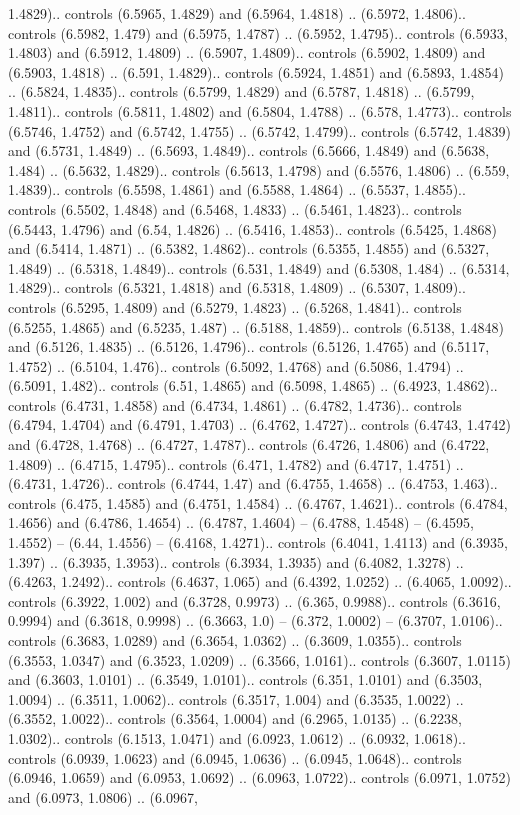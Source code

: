 1.4829).. controls (6.5965, 1.4829) and (6.5964, 1.4818) .. (6.5972, 1.4806).. controls (6.5982, 1.479) and (6.5975, 1.4787) .. (6.5952, 1.4795).. controls (6.5933, 1.4803) and (6.5912, 1.4809) .. (6.5907, 1.4809).. controls (6.5902, 1.4809) and (6.5903, 1.4818) .. (6.591, 1.4829).. controls (6.5924, 1.4851) and (6.5893, 1.4854) .. (6.5824, 1.4835).. controls (6.5799, 1.4829) and (6.5787, 1.4818) .. (6.5799, 1.4811).. controls (6.5811, 1.4802) and (6.5804, 1.4788) .. (6.578, 1.4773).. controls (6.5746, 1.4752) and (6.5742, 1.4755) .. (6.5742, 1.4799).. controls (6.5742, 1.4839) and (6.5731, 1.4849) .. (6.5693, 1.4849).. controls (6.5666, 1.4849) and (6.5638, 1.484) .. (6.5632, 1.4829).. controls (6.5613, 1.4798) and (6.5576, 1.4806) .. (6.559, 1.4839).. controls (6.5598, 1.4861) and (6.5588, 1.4864) .. (6.5537, 1.4855).. controls (6.5502, 1.4848) and (6.5468, 1.4833) .. (6.5461, 1.4823).. controls (6.5443, 1.4796) and (6.54, 1.4826) .. (6.5416, 1.4853).. controls (6.5425, 1.4868) and (6.5414, 1.4871) .. (6.5382, 1.4862).. controls (6.5355, 1.4855) and (6.5327, 1.4849) .. (6.5318, 1.4849).. controls (6.531, 1.4849) and (6.5308, 1.484) .. (6.5314, 1.4829).. controls (6.5321, 1.4818) and (6.5318, 1.4809) .. (6.5307, 1.4809).. controls (6.5295, 1.4809) and (6.5279, 1.4823) .. (6.5268, 1.4841).. controls (6.5255, 1.4865) and (6.5235, 1.487) .. (6.5188, 1.4859).. controls (6.5138, 1.4848) and (6.5126, 1.4835) .. (6.5126, 1.4796).. controls (6.5126, 1.4765) and (6.5117, 1.4752) .. (6.5104, 1.476).. controls (6.5092, 1.4768) and (6.5086, 1.4794) .. (6.5091, 1.482).. controls (6.51, 1.4865) and (6.5098, 1.4865) .. (6.4923, 1.4862).. controls (6.4731, 1.4858) and (6.4734, 1.4861) .. (6.4782, 1.4736).. controls (6.4794, 1.4704) and (6.4791, 1.4703) .. (6.4762, 1.4727).. controls (6.4743, 1.4742) and (6.4728, 1.4768) .. (6.4727, 1.4787).. controls (6.4726, 1.4806) and (6.4722, 1.4809) .. (6.4715, 1.4795).. controls (6.471, 1.4782) and (6.4717, 1.4751) .. (6.4731, 1.4726).. controls (6.4744, 1.47) and (6.4755, 1.4658) .. (6.4753, 1.463).. controls (6.475, 1.4585) and (6.4751, 1.4584) .. (6.4767, 1.4621).. controls (6.4784, 1.4656) and (6.4786, 1.4654) .. (6.4787, 1.4604) -- (6.4788, 1.4548) -- (6.4595, 1.4552) -- (6.44, 1.4556) -- (6.4168, 1.4271).. controls (6.4041, 1.4113) and (6.3935, 1.397) .. (6.3935, 1.3953).. controls (6.3934, 1.3935) and (6.4082, 1.3278) .. (6.4263, 1.2492).. controls (6.4637, 1.065) and (6.4392, 1.0252) .. (6.4065, 1.0092).. controls (6.3922, 1.002) and (6.3728, 0.9973) .. (6.365, 0.9988).. controls (6.3616, 0.9994) and (6.3618, 0.9998) .. (6.3663, 1.0) -- (6.372, 1.0002) -- (6.3707, 1.0106).. controls (6.3683, 1.0289) and (6.3654, 1.0362) .. (6.3609, 1.0355).. controls (6.3553, 1.0347) and (6.3523, 1.0209) .. (6.3566, 1.0161).. controls (6.3607, 1.0115) and (6.3603, 1.0101) .. (6.3549, 1.0101).. controls (6.351, 1.0101) and (6.3503, 1.0094) .. (6.3511, 1.0062).. controls (6.3517, 1.004) and (6.3535, 1.0022) .. (6.3552, 1.0022).. controls (6.3564, 1.0004) and (6.2965, 1.0135) .. (6.2238, 1.0302).. controls (6.1513, 1.0471) and (6.0923, 1.0612) .. (6.0932, 1.0618).. controls (6.0939, 1.0623) and (6.0945, 1.0636) .. (6.0945, 1.0648).. controls (6.0946, 1.0659) and (6.0953, 1.0692) .. (6.0963, 1.0722).. controls (6.0971, 1.0752) and (6.0973, 1.0806) .. (6.0967, 